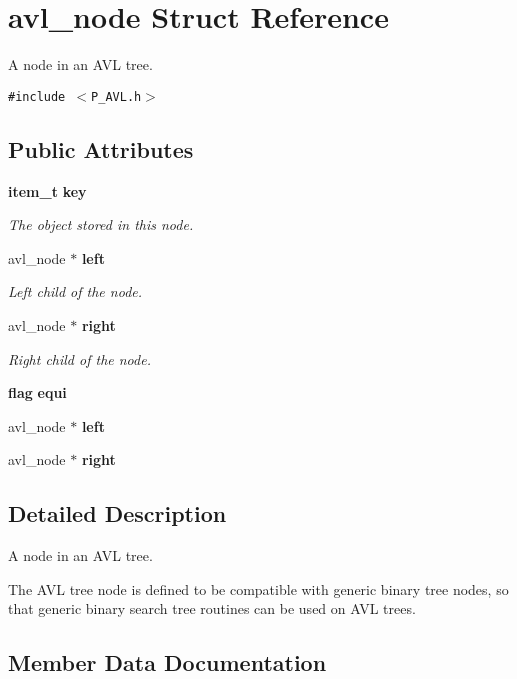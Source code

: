 \section{avl\_\-node  Struct Reference}
\label{structavl__node}
A node in an AVL tree. 


{\tt \#include $<$P\_\-AVL.h$>$}

\subsection*{Public Attributes}
\begin{CompactItemize}
\item 
{\bf item\_\-t} {\bf key}
\begin{CompactList}\small\item\em The object stored in this node.\item\end{CompactList}\item 
avl\_\-node $\ast$ {\bf left}
\begin{CompactList}\small\item\em Left child of the node.\item\end{CompactList}\item 
avl\_\-node $\ast$ {\bf right}
\begin{CompactList}\small\item\em Right child of the node.\item\end{CompactList}\item 
{\bf flag} {\bf equi}
\item 
avl\_\-node $\ast$ {\bf left}
\item 
avl\_\-node $\ast$ {\bf right}
\end{CompactItemize}


\subsection{Detailed Description}
A node in an AVL tree.



 The AVL tree node is defined to be compatible with generic binary tree nodes, so that generic binary search tree routines can be used on AVL trees. 



\subsection{Member Data Documentation}
